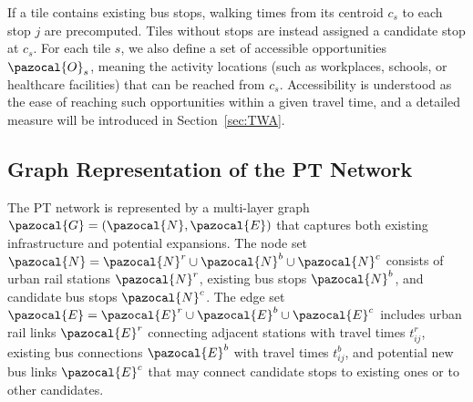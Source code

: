 \documentclass[3p,times,procedia]{elsarticle}
\begin{document}
If a tile contains existing bus stops, walking times  from its centroid $c_s$ to each stop $j$ are precomputed. 
Tiles without stops are instead assigned a candidate stop at $c_s$. 
For each tile $s$, we also define a set of accessible opportunities $\pazocal{O}_s$, 
meaning the activity locations (such as workplaces, schools, or healthcare facilities) that can be reached from $c_s$. 
Accessibility is understood as the ease of reaching such opportunities within a given travel time, 
and a detailed measure will be introduced in Section~\ref{sec:TWA}.

\subsection{Graph Representation of the PT Network}\label{subsec:graph}
The PT network is represented by a multi-layer graph $\pazocal{G} = (\pazocal{N}, \pazocal{E})$ that captures both existing infrastructure and potential expansions. The node set $\pazocal{N} = \pazocal{N}^r \cup \pazocal{N}^b \cup \pazocal{N}^c$ consists of urban rail stations $\pazocal{N}^r$, existing bus stops $\pazocal{N}^b$, and candidate bus stops $\pazocal{N}^c$. The edge set $\pazocal{E} = \pazocal{E}^r \cup \pazocal{E}^b \cup \pazocal{E}^c$ includes urban rail links $\pazocal{E}^r$ connecting adjacent stations with travel times $t_{ij}^r$, existing bus connections $\pazocal{E}^b$ with travel times $t_{ij}^b$, and potential new bus links $\pazocal{E}^c$ that may connect candidate stops to existing ones or to other candidates.

\end{document}
